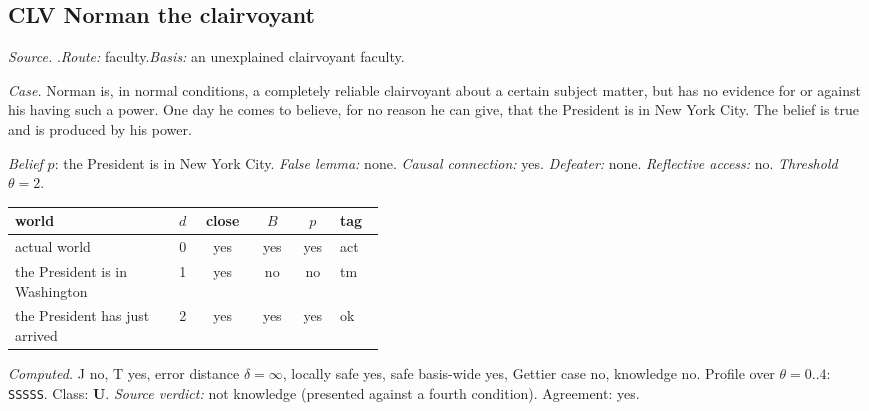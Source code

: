 \subsection*{CLV \enspace Norman the clairvoyant}
\noindent\textit{Source.} \citet{BonJour1980}.\quad \textit{Route:} faculty.\quad \textit{Basis:} an unexplained clairvoyant faculty.\par
\noindent\textit{Case.} Norman is, in normal conditions, a completely reliable clairvoyant about a certain subject matter, but has no evidence for or against his having such a power. One day he comes to believe, for no reason he can give, that the President is in New York City. The belief is true and is produced by his power.\par
\noindent\textit{Belief} $p$: the President is in New York City.
 \textit{False lemma:} none. \textit{Causal connection:} yes. \textit{Defeater:} none. \textit{Reflective access:} no. \textit{Threshold} $\theta = 2$.\par
\begin{center}\begin{tabular}{@{}p{0.43\linewidth}rcccl@{}}
world & $d$ & close & $B$ & $p$ & tag \\ \midrule
actual world & 0 & yes & yes & yes & act \\
the President is in Washington & 1 & yes & no & no & tm \\
the President has just arrived & 2 & yes & yes & yes & ok \\
\end{tabular}\end{center}
\noindent\textit{Computed.} J no, T yes, error distance $\delta = \infty$, locally safe yes, safe basis-wide yes, Gettier case no, knowledge no. Profile over $\theta = 0..4$: \texttt{SSSSS}. Class: \textbf{U}.
 \textit{Source verdict:} not knowledge (presented against a fourth condition). Agreement: yes.
\par\medskip
{}

